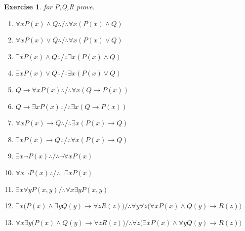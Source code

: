 \documentclass[10pt,a4paper]{book}
\newtheorem{exercise}{Exercise}[section]
\begin{document}
\begin{exercise}
    \textbf{}for P,Q,R prove.
    \begin{enumerate}
        \setlength{\itemsep}{0pt} %
        \item   $ \forall x P(x) \wedge Q \therefore /\therefore \forall x(P(x) \wedge Q) $ \quad{}
        \item   $ \forall x P(x) \vee Q \therefore /\therefore \forall x(P(x) \vee Q) $ \quad{}
        \item   $ \exists x P(x) \wedge Q \therefore /\therefore \exists x(P(x) \wedge Q) $ \quad{}
        \item   $ \exists x P(x) \vee Q \therefore /\therefore \exists x(P(x) \vee Q) $ \quad{}
        \item   $Q \rightarrow \forall x P(x) \therefore /\therefore \forall x(Q \rightarrow P(x)) $  \quad{}
        \item   $Q \rightarrow \exists x P(x) \therefore /\therefore \exists x(Q \rightarrow P(x)) $  \quad{}
        \item   $\forall x P(x) \rightarrow Q \therefore /\therefore \exists x(P(x) \rightarrow Q) $  \quad{}
        \item   $\exists x P(x) \rightarrow Q \therefore /\therefore \forall x(P(x) \rightarrow Q) $         \quad{}
        \item   $ \exists x \neg P(x) \therefore /\therefore \neg \forall x P(x)  $   \quad{}
        \item   $ \forall x \neg P(x) \therefore /\therefore \neg \exists x P(x) $   \quad{}
        \item   $ \exists x \forall y  P(x,y)  /\therefore \forall x \exists y  P(x,y)  $  \quad{}
        \item   $ \exists x \Big(P(x) \wedge \exists y Q(y) \rightarrow \forall z R(z)\Big) /\therefore \forall y \forall z \Big(\forall x P(x) \wedge Q(y) \rightarrow R(z)\Big) $
        \item   $ \forall x \exists y \Big(P(x) \wedge Q(y) \rightarrow \forall z R(z)\Big) /\therefore \forall z \Big(\exists x P(x) \wedge \forall y Q(y) \rightarrow R(z)\Big) $

\end{enumerate}
\end{exercise}
\end{document}
